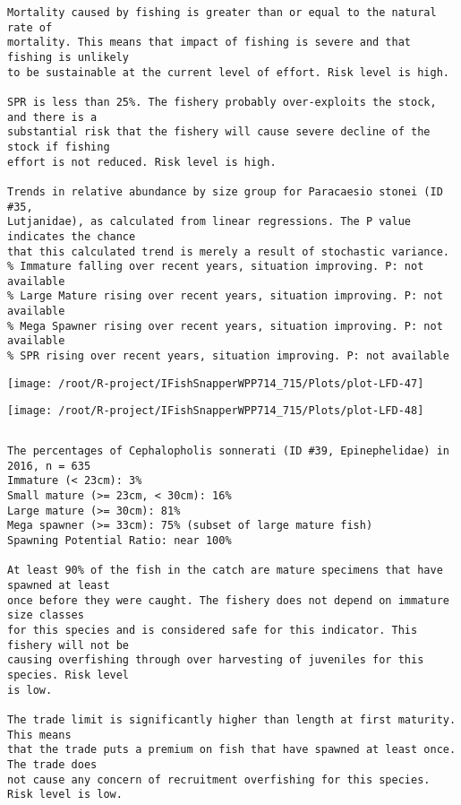\documentclass{report}\usepackage[]{graphicx}\usepackage[]{color}
\makeatletter
\def\maxwidth{ %
  \ifdim\Gin@nat@width>\linewidth
    \linewidth
  \else
    \Gin@nat@width
  \fi
}
\newenvironment{kframe}{%
 \def\at@end@of@kframe{}%
 \ifinner\ifhmode%
  \def\at@end@of@kframe{\end{minipage}}%
  \begin{minipage}{\columnwidth}%
 \fi\fi%
 \def\FrameCommand##1{\hskip\@totalleftmargin \hskip-\fboxsep
 \colorbox{shadecolor}{##1}\hskip-\fboxsep
     \hskip-\linewidth \hskip-\@totalleftmargin \hskip\columnwidth}%
 \MakeFramed {\advance\hsize-\width
   \@totalleftmargin\z@ \linewidth\hsize
   \@setminipage}}%
 {\par\unskip\endMakeFramed%
 \at@end@of@kframe}
\newenvironment{knitrout}{}{} %
\makeatother
\begin{document}
\begin{knitrout}
\begin{kframe}
\begin{verbatim}
Mortality caused by fishing is greater than or equal to the natural rate of
mortality. This means that impact of fishing is severe and that fishing is unlikely
to be sustainable at the current level of effort. Risk level is high.
 
SPR is less than 25%. The fishery probably over-exploits the stock, and there is a
substantial risk that the fishery will cause severe decline of the stock if fishing
effort is not reduced. Risk level is high.
 
Trends in relative abundance by size group for Paracaesio stonei (ID #35,
Lutjanidae), as calculated from linear regressions. The P value indicates the chance
that this calculated trend is merely a result of stochastic variance.
% Immature falling over recent years, situation improving. P: not available
% Large Mature rising over recent years, situation improving. P: not available
% Mega Spawner rising over recent years, situation improving. P: not available
% SPR rising over recent years, situation improving. P: not available
\end{verbatim}
\end{kframe}
\texttt{[image: /root/R-project/IFishSnapperWPP714\_715/Plots/plot-LFD-47]} 

\texttt{[image: /root/R-project/IFishSnapperWPP714\_715/Plots/plot-LFD-48]} 
\begin{kframe}\begin{verbatim}
\end{verbatim}
\end{kframe}
\clearpage
\newpage
\begin{kframe}\begin{verbatim}The percentages of Cephalopholis sonnerati (ID #39, Epinephelidae) in 2016, n = 635
Immature (< 23cm): 3%
Small mature (>= 23cm, < 30cm): 16%
Large mature (>= 30cm): 81%
Mega spawner (>= 33cm): 75% (subset of large mature fish)
Spawning Potential Ratio: near 100%
 
At least 90% of the fish in the catch are mature specimens that have spawned at least
once before they were caught. The fishery does not depend on immature size classes
for this species and is considered safe for this indicator. This fishery will not be
causing overfishing through over harvesting of juveniles for this species. Risk level
is low.

The trade limit is significantly higher than length at first maturity.  This means
that the trade puts a premium on fish that have spawned at least once. The trade does
not cause any concern of recruitment overfishing for this species. Risk level is low.


\end{verbatim}
\end{kframe}
\end{knitrout}
\end{document}
